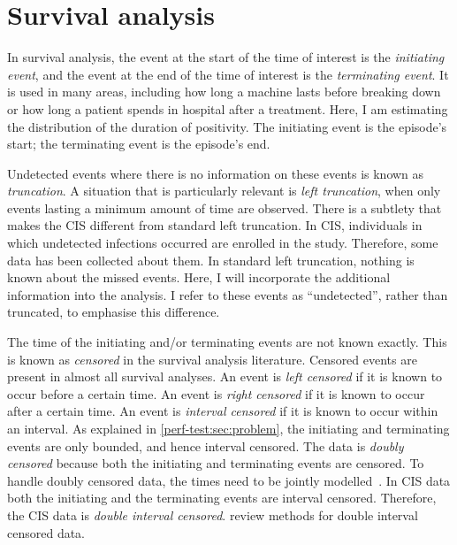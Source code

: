 \documentclass[thesis.tex]{subfiles}
\begin{document}
\section{Survival analysis}

In survival analysis, the event at the start of the time of interest is the \emph{initiating event}, and the event at the end of the time of interest is the \emph{terminating event}.
It is used in many areas, including how long a machine lasts before breaking down or how long a patient spends in hospital after a treatment.
Here, I am estimating the distribution of the duration of positivity.
The initiating event is the episode's start; the terminating event is the episode's end.

Undetected events where there is no information on these events is known as \emph{truncation}.
A situation that is particularly relevant is \emph{left truncation}, when only events lasting a minimum amount of time are observed.
There is a subtlety that makes the CIS different from standard left truncation.
In CIS, individuals in which undetected infections occurred are enrolled in the study.
Therefore, some data has been collected about them.
In standard left truncation, nothing is known about the missed events.
Here, I will incorporate the additional information into the analysis.
I refer to these events as ``undetected'', rather than truncated, to emphasise this difference.

The time of the initiating and/or terminating events are not known exactly.
This is known as \emph{censored} in the survival analysis literature.
Censored events are present in almost all survival analyses.
An event is \emph{left censored} if it is known to occur before a certain time.
An event is \emph{right censored} if it is known to occur after a certain time.
An event is \emph{interval censored} if it is known to occur within an interval.
As explained in \cref{perf-test:sec:problem}, the initiating and terminating events are only bounded, and hence interval censored.
The data is \emph{doubly censored} because both the initiating and terminating events are censored.
To handle doubly censored data, the times need to be jointly modelled~\autocite[and references therein]{liSemiparametric}.
In CIS data both the initiating and the terminating events are interval censored.
Therefore, the CIS data is \emph{double interval censored}.
\Textcite{sunAnalysis,bogaertsSurvival} review methods for double interval censored data.
\end{document}
